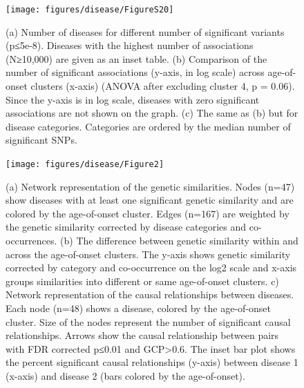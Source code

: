 \documentclass[12pt,twoside]{unicam}
\begin{document}
\begin{figure}

{\centering \texttt{[image: figures/disease/FigureS20]} 

}

\caption[Distribution of significant disease associations across diseases, age-of-onset clusters, and disease categories.]{(a) Number of diseases for different number of significant variants (p≤5e-8). Diseases with the highest number of associations (N≥10,000) are given as an inset table. (b) Comparison of the number of significant associations (y-axis, in log scale) across age-of-onset clusters (x-axis) (ANOVA after excluding cluster 4, p = 0.06). Since the y-axis is in log scale, diseases with zero significant associations are not shown on the graph. (c) The same as (b) but for disease categories. Categories are ordered by the median number of significant SNPs.}\label{fig:disFigS20}
\end{figure}

\begin{figure}

{\centering \texttt{[image: figures/disease/Figure2]} 

}

\caption[Genetic similarities and cause-effect relationships between diseases.]{(a) Network representation of the genetic similarities. Nodes (n=47) show diseases with at least one significant genetic similarity and are colored by the age-of-onset cluster. Edges (n=167) are weighted by the genetic similarity corrected by disease categories and co-occurrences. (b) The difference between genetic similarity within and across the age-of-onset clusters. The y-axis shows genetic similarity corrected by category and co-occurrence on the log2 scale and x-axis groups similarities into different or same age-of-onset clusters. c) Network representation of the causal relationships between diseases. Each node (n=48) shows a disease, colored by the age-of-onset cluster. Size of the nodes represent the number of significant causal relationships. Arrows show the causal relationship between pairs with FDR corrected p≤0.01 and GCP>0.6. The inset bar plot shows the percent significant causal relationships (y-axis) between disease 1 (x-axis) and disease 2 (bars colored by the age-of-onset).}\label{fig:disFig2}
\end{figure}
\end{document}
